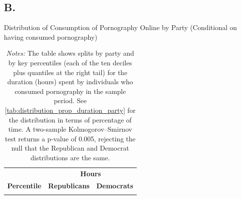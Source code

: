 \documentclass[12pt,twoside]{article}
\begin{document}
\clearpage
\setcounter{table}{0}
\setcounter{figure}{0}
\setcounter{equation}{0}
\FloatBarrier
\renewcommand{\thetable}{B\arabic{table}}
\renewcommand{\thefigure}{B\arabic{figure}}
\renewcommand{\theequation}{B\arabic{equation}}
\subsection{B. \smBTitle{}}\label{sm:smB}

\begin{table}[ht] \centering \small \setlength\tabcolsep{10 pt}
	\caption{Distribution of Consumption of Pornography Online by Party (Conditional on having consumed pornography)}
	\label{tab:distribution_duration_party}
	\begin{adjustbox}{max width=\textwidth}
		\begin{tabular}{crr}
			\toprule
			\multicolumn{1}{l}{\textbf{}}&\multicolumn{2}{c}{\textbf{Hours}}\\
			\cmidrule(l){2-3}
			\multicolumn{1}{l}{\textbf{Percentile}}&\multicolumn{1}{c}{\textbf{Republicans}}&\multicolumn{1}{c}{\textbf{Democrats}}\\
			\midrule
			\\
			\bottomrule
		\end{tabular}
	\end{adjustbox}
	\caption*{\footnotesize \emph{Notes:} 
		The table shows splits by party and by key percentiles (each of the ten deciles plus quantiles at the right tail) for the duration (hours) spent by individuals who consumed pornography in the sample period. 
		See \cref{tab:distribution_prop_duration_party} for the distribution in terms of percentage of time. 
		A two-sample Kolmogorov–Smirnov test returns a p-value of 0.005, rejecting the null that the Republican and Democrat distributions are the same.
	}
\end{table}
\end{document}
